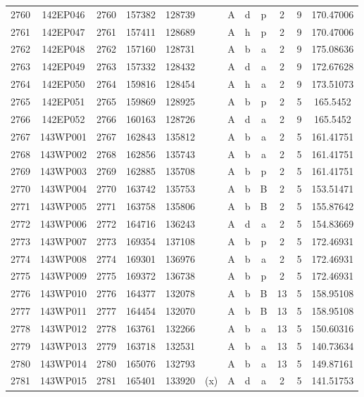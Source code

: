 \begin{tabular}{|*{12}{c|}}
2760 & 142EP046 & 2760 & 157382 & 128739 &  & A & d & p & 2 & 9 & 170.47006 \\ 
2761 & 142EP047 & 2761 & 157411 & 128689 &  & A & h & p & 2 & 9 & 170.47006 \\ 
2762 & 142EP048 & 2762 & 157160 & 128731 &  & A & b & a & 2 & 9 & 175.08636 \\ 
2763 & 142EP049 & 2763 & 157332 & 128432 &  & A & d & a & 2 & 9 & 172.67628 \\ 
2764 & 142EP050 & 2764 & 159816 & 128454 &  & A & h & a & 2 & 9 & 173.51073 \\ 
2765 & 142EP051 & 2765 & 159869 & 128925 &  & A & b & p & 2 & 5 & 165.5452 \\ 
2766 & 142EP052 & 2766 & 160163 & 128726 &  & A & d & a & 2 & 9 & 165.5452 \\ 
2767 & 143WP001 & 2767 & 162843 & 135812 &  & A & b & a & 2 & 5 & 161.41751 \\ 
2768 & 143WP002 & 2768 & 162856 & 135743 &  & A & b & a & 2 & 5 & 161.41751 \\ 
2769 & 143WP003 & 2769 & 162885 & 135708 &  & A & b & p & 2 & 5 & 161.41751 \\ 
2770 & 143WP004 & 2770 & 163742 & 135753 &  & A & b & B & 2 & 5 & 153.51471 \\ 
2771 & 143WP005 & 2771 & 163758 & 135806 &  & A & b & B & 2 & 5 & 155.87642 \\ 
2772 & 143WP006 & 2772 & 164716 & 136243 &  & A & d & a & 2 & 5 & 154.83669 \\ 
2773 & 143WP007 & 2773 & 169354 & 137108 &  & A & b & p & 2 & 5 & 172.46931 \\ 
2774 & 143WP008 & 2774 & 169301 & 136976 &  & A & b & a & 2 & 5 & 172.46931 \\ 
2775 & 143WP009 & 2775 & 169372 & 136738 &  & A & b & p & 2 & 5 & 172.46931 \\ 
2776 & 143WP010 & 2776 & 164377 & 132078 &  & A & b & B & 13 & 5 & 158.95108 \\ 
2777 & 143WP011 & 2777 & 164454 & 132070 &  & A & b & B & 13 & 5 & 158.95108 \\ 
2778 & 143WP012 & 2778 & 163761 & 132266 &  & A & b & a & 13 & 5 & 150.60316 \\ 
2779 & 143WP013 & 2779 & 163718 & 132531 &  & A & b & a & 13 & 5 & 140.73634 \\ 
2780 & 143WP014 & 2780 & 165076 & 132793 &  & A & b & a & 13 & 5 & 149.87161 \\ 
2781 & 143WP015 & 2781 & 165401 & 133920 & (x) & A & d & a & 2 & 5 & 141.51753 \\ 

\end{tabular}
